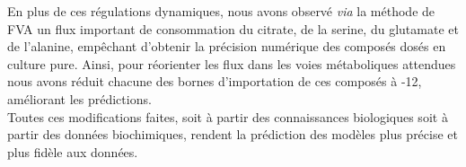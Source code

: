 





En plus de ces régulations dynamiques, nous avons observé \textit{via} la méthode de FVA un flux important de consommation du citrate, de la serine, du glutamate et de l'alanine, empêchant d'obtenir la précision numérique des composés dosés en culture pure. Ainsi, pour réorienter les flux dans les voies métaboliques attendues nous avons réduit chacune des bornes d'importation de ces composés à -12, améliorant les prédictions. \\

Toutes ces modifications faites, soit à partir des connaissances biologiques soit à partir des données biochimiques, rendent la prédiction des modèles plus précise et plus fidèle aux données. \\

